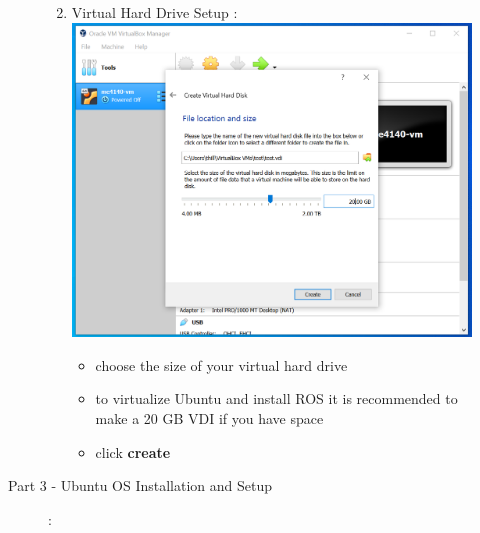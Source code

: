 \documentclass[12pt]{article}
\begin{document}
\begin{description}
\begin{description}
\begin{enumerate}[label=\alph*)]
\vspace{10mm}
\item Virtual Hard Drive Setup : \vspace{5mm} \\
      		\hspace*{-2.5cm}\includegraphics[scale=.50]{CaptureX.png}\\
             \begin{itemize}
                    
                \item choose the size of your virtual hard drive       
                \item to virtualize Ubuntu and install ROS it is recommended to make a 20 GB VDI if you have space
                \item click {\bf create}
          
            
                
            \end{itemize}
	\newpage

     \end{enumerate}

\item[Part 3 - Ubuntu OS Installation and Setup]: \vspace{5mm} \\


\end{description}
\end{description}
\end{document}
